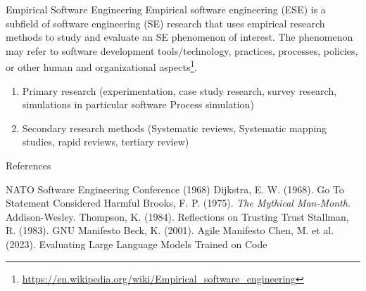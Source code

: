 \documentclass{beamer}
\begin{document}
\begin{frame}[t]{Empirical Software Engineering}
Empirical software engineering (ESE) is a subfield of software engineering (SE) research that uses empirical research methods to study and evaluate an SE phenomenon of interest. The phenomenon may refer to software development tools/technology, practices, processes, policies, or other human and organizational aspects\footnote{\url{https://en.wikipedia.org/wiki/Empirical_software_engineering}}. %

\begin{enumerate}
    \item Primary research (experimentation, case study research, survey research, simulations in particular software Process simulation)
    \item Secondary research methods (Systematic reviews, Systematic mapping studies, rapid reviews, tertiary review)
\end{enumerate}
\end{frame}
\begin{frame}[t]{References}
\begin{thebibliography}{10}
 NATO Software Engineering Conference (1968)
 Dijkstra, E. W. (1968). Go To Statement Considered Harmful
 Brooks, F. P. (1975). \textit{The Mythical Man-Month}. Addison-Wesley. %
 Thompson, K. (1984). Reflections on Trusting Trust
 Stallman, R. (1983). GNU Manifesto
 Beck, K. (2001). Agile Manifesto
 Chen, M. et al. (2023). Evaluating Large Language Models Trained on Code
\end{thebibliography}
\end{frame}
\end{document}
